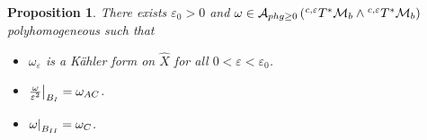 \documentclass[a4paper,11pt]{article}
\newcounter{mythm}[section]
\newtheorem{pr}[mythm]{Proposition}
\newcommand\restr[2]{{%
  \left.\kern-\nulldelimiterspace %
  #1 %
  \littletaller %
  \right|_{#2} %
  }}
\newcommand{\littletaller}{\mathchoice{\vphantom{\big|}}{}{}{}}
\begin{document}
\begin{pr} \label{glue}
    There exists $\varepsilon_0>0$ and $\omega \in \mathcal{A}_{phg \geq 0} \left( \hspace{0.01cm} ^{c,\varepsilon} T^{*} \mathcal{M}_b \wedge \hspace{0.01cm} ^{c,\varepsilon} T^{*} \mathcal{M}_b \right)$ polyhomogeneous such that 
    \begin{itemize}
        \item $\omega_\varepsilon$ is a Kähler form on $\hat X$ for all $0< \varepsilon < \varepsilon_0 $. 
        \item $\restr{\frac{\omega}{\varepsilon^2}}{B_I} = \omega_{AC}$.
        \item $\restr{\omega}{B_{II}} = \omega_C$.
    \end{itemize}
\end{pr}
\end{document}
